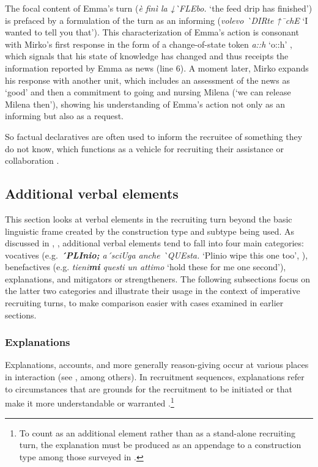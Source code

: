 \documentclass[output=paper,modfonts]{langscibook}
\begin{document}
The focal content of Emma's turn (\textit{è finì la ↓\`{}FLEbo.} ‘the feed drip has finished’) is prefaced by a formulation of the turn as an informing (\textit{volevo \`{}DIRte ↑¯{}chE} ‘I wanted to tell you that’). This characterization of Emma's action is consonant with Mirko's first response in the form of a change-of-state token \textit{a::h} ‘o::h’ \citep{Heritage1984a}, which signals that his state of knowledge has changed and thus receipts the information reported by Emma as news (line 6). A moment later, Mirko expands his response with another unit, which includes an assessment of the news as ‘good’ and then a commitment to going and nursing Milena (‘we can release Milena then’), showing his understanding of Emma's action not only as an informing but also as a request.

So factual declaratives are often used to inform the recruitee of something they do not know, which functions as a vehicle for recruiting their assistance or collaboration \citep{Rossi2018}.

\subsection{Additional verbal elements}\label{sec:rossi:3.4}
This section looks at verbal elements in the recruiting turn beyond the basic linguistic frame created by the construction type and subtype being used. As discussed in , , additional verbal elements tend to fall into four main categories: vocatives (e.g. \textit{\textbf{´{}PLInio;} a´{}sciUga anche \`{}QUEsta.} ‘Plinio wipe this one too’, ), benefactives (e.g. \textit{tieni\textbf{mi} questi un attimo} ‘hold these for me one second’), explanations, and mitigators or strengtheners. The following subsections focus on the latter two categories and illustrate their usage in the context of imperative recruiting turns, to make comparison easier with cases examined in earlier sections.

\subsubsection{Explanations}\label{sec:rossi:3.4.1}
Explanations, accounts, and more generally reason-giving occur at various places in interaction (see \citealt{Goodwin1987,Antaki1994,Drew1998,Waring2007,Parry2009,BoldenRobinson2011}, among others). In recruitment sequences, explanations refer to circumstances that are grounds for the recruitment to be initiated or that make it more understandable or warranted \citep[see][]{Parry2013,BaranovaDingemanse2016,Rossi2017}.\footnote{To count as an additional element rather than as a stand-alone recruiting turn, the explanation must be produced as an appendage to a construction type among those surveyed in .} %
\end{document}
